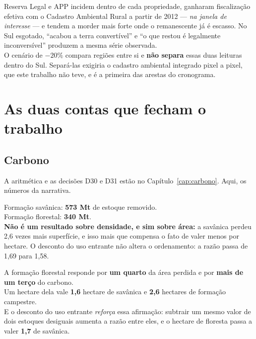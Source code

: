 \begin{armadilha}
Reserva Legal e APP incidem dentro de cada propriedade, ganharam fiscalização
efetiva com o Cadastro Ambiental Rural a partir de 2012 --- \emph{na janela de
interesse} --- e tendem a morder mais forte onde o remanescente já é escasso. No
Sul esgotado, ``acabou a terra convertível'' e ``o que restou é legalmente
inconversível'' produzem a mesma série observada. \\[4pt]
O cenário de $-20\%$ compara regiões entre si e \textbf{não separa} essas duas
leituras dentro do Sul. Separá-las exigiria o cadastro ambiental integrado pixel
a pixel, que este trabalho não teve, e é a primeira das arestas do
cronograma.
\end{armadilha}

\chapter{As duas contas que fecham o trabalho}

\section{Carbono}

A aritmética e as decisões D30 e D31 estão no Capítulo~\ref{cap:carbono}. Aqui,
os números da narrativa.

\begin{ancora}
Formação savânica: \textbf{573 Mt} de estoque removido. \\
Formação florestal: \textbf{340 Mt}. \\[4pt]
\textbf{Não é um resultado sobre densidade, e sim sobre área:} a savânica perdeu
2,6 vezes mais superfície, e isso mais que compensa o fato de valer menos por
hectare. O desconto do uso entrante não altera o ordenamento: a razão passa de
1,69 para 1,58.
\end{ancora}

\begin{ancora}
A formação florestal responde por \textbf{um quarto} da área perdida e por
\textbf{mais de um terço} do carbono. \\
Um hectare dela vale \textbf{1,6} hectare de savânica e \textbf{2,6} hectares de
formação campestre. \\
E o desconto do uso entrante \emph{reforça} essa afirmação: subtrair um mesmo
valor de dois estoques desiguais aumenta a razão entre eles, e o hectare de
floresta passa a valer \textbf{1,7} de savânica.
\end{ancora}

